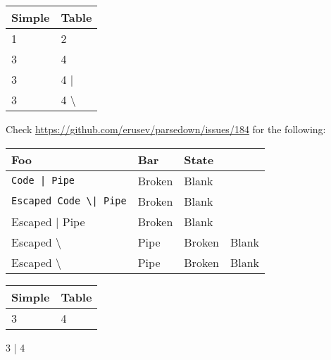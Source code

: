 \noindent\begin{tabularx}{\textwidth}{|X|X|}\hline
Simple & Table\\ \hline
1      & 2\\ \hline
3      & 4\\ \hline
3      & 4     |\\ \hline
3      & 4    {\textbackslash}\\ \hline
\end{tabularx}

Check \url{https://github.com/erusev/parsedown/issues/184} for the following:


\noindent\begin{tabularx}{\textwidth}{|X|X|X|}\hline
Foo & Bar & State\\ \hline
\lstinline`Code | Pipe` & Broken & Blank\\ \hline
\lstinline`Escaped Code \| Pipe` & Broken & Blank\\ \hline
Escaped | Pipe & Broken & Blank\\ \hline
Escaped {\textbackslash}& Pipe & Broken & Blank\\ \hline
Escaped {\textbackslash} & Pipe & Broken & Blank\\ \hline
\end{tabularx}


\noindent\begin{tabularx}{\textwidth}{|l|X|}\hline
Simple & Table\\ \hline
3      & 4\\ \hline
\end{tabularx}

3      | 4

